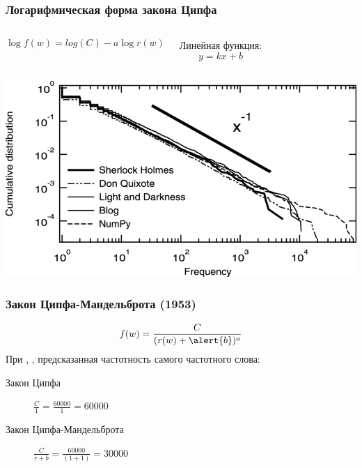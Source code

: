 \documentclass[svgnames]{beamer}
\begin{document}
\begin{frame}
  \frametitle{Логарифмическая форма закона Ципфа}

  \begin{columns}
    \begin{equation}
      \log f(w) = log(C) - a\log r(w)
    \end{equation}

    \begin{block}{Линейная функция:}
    $$
    y = kx + b
    $$
  \end{block}
\end{columns}
\end{frame}

\begin{frame}[plain]
  \includegraphics[width=\textwidth]{zipf-log-ex}
\end{frame}

\begin{frame}
  \frametitle{Закон Ципфа-Мандельброта (1953)}
  \begin{equation}
    f(w) = \frac{C}{(r(w) + \alert{b})^a}
  \end{equation}
  При , , 
  предсказанная частотность самого частотного слова:
  \begin{description}
  \item[Закон Ципфа] $\frac{C}{1}=\frac{60000}{1}=60000$
  \item[Закон Ципфа-Мандельброта] $\frac{C}{r+b}=\frac{60000}{(1+1)}=30000$
  \end{description}
\end{frame}
\end{document}
